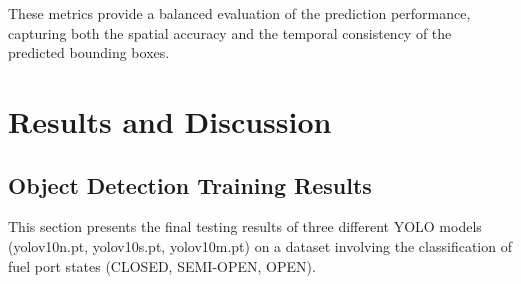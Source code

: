\documentclass[12pt,oneside]{book} %
\begin{document}
These metrics provide a balanced evaluation of the prediction performance,
capturing both the spatial accuracy and the temporal consistency of the
predicted bounding boxes.

\chapter{Results and Discussion}\label{chap:results}

\section{Object Detection Training Results}

This section presents the final testing results of three different YOLO models
(yolov10n.pt, yolov10s.pt, yolov10m.pt) on a dataset involving the
classification of fuel port states (CLOSED, SEMI-OPEN, OPEN).
\end{document}
